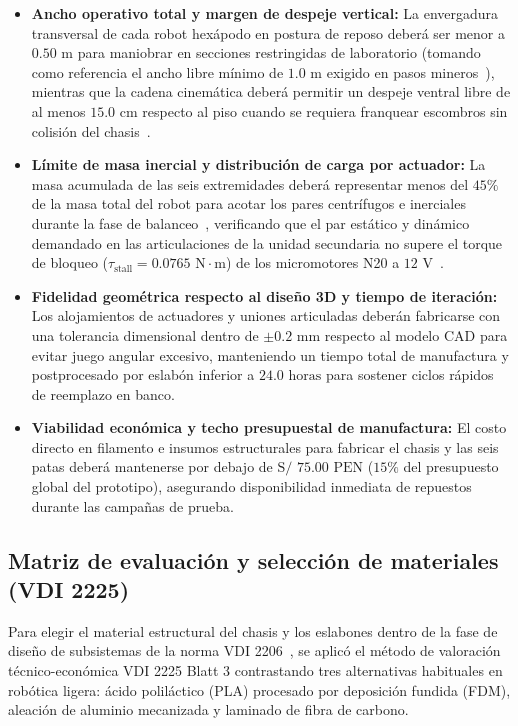 \begin{itemize}
    \item \textbf{Ancho operativo total y margen de despeje vertical:} La envergadura transversal de cada robot hexápodo en postura de reposo deberá ser menor a $0.50\text{ m}$ para maniobrar en secciones restringidas de laboratorio (tomando como referencia el ancho libre mínimo de $1.0\text{ m}$ exigido en pasos mineros~\cite{MINEM_DS024_2016}), mientras que la cadena cinemática deberá permitir un despeje ventral libre de al menos $15.0\text{ cm}$ respecto al piso cuando se requiera franquear escombros sin colisión del chasis~\cite{Obosu2025_Automation}.
    \item \textbf{Límite de masa inercial y distribución de carga por actuador:} La masa acumulada de las seis extremidades deberá representar menos del $45\%$ de la masa total del robot para acotar los pares centrífugos e inerciales durante la fase de balanceo~\cite{Sensors2021_HexapodReview}, verificando que el par estático y dinámico demandado en las articulaciones de la unidad secundaria no supere el torque de bloqueo ($\tau_{\text{stall}} = 0.0765\text{ N}\cdot\text{m}$) de los micromotores N20 a $12\text{ V}$~\cite{N20_Datasheet}.
    \item \textbf{Fidelidad geométrica respecto al diseño 3D y tiempo de iteración:} Los alojamientos de actuadores y uniones articuladas deberán fabricarse con una tolerancia dimensional dentro de $\pm 0.2\text{ mm}$ respecto al modelo CAD para evitar juego angular excesivo, manteniendo un tiempo total de manufactura y postprocesado por eslabón inferior a $24.0\text{ horas}$ para sostener ciclos rápidos de reemplazo en banco.
    \item \textbf{Viabilidad económica y techo presupuestal de manufactura:} El costo directo en filamento e insumos estructurales para fabricar el chasis y las seis patas deberá mantenerse por debajo de $\text{S/ } 75.00\text{ PEN}$ ($15\%$ del presupuesto global del prototipo), asegurando disponibilidad inmediata de repuestos durante las campañas de prueba.
\end{itemize}


\subsection{Matriz de evaluación y selección de materiales (VDI 2225)}

Para elegir el material estructural del chasis y los eslabones dentro de la fase de diseño de subsistemas de la norma VDI 2206~\cite{VDI2206_2004}, se aplicó el método de valoración técnico-económica VDI 2225 Blatt 3 contrastando tres alternativas habituales en robótica ligera: ácido poliláctico (PLA) procesado por deposición fundida (FDM), aleación de aluminio mecanizada y laminado de fibra de carbono.

